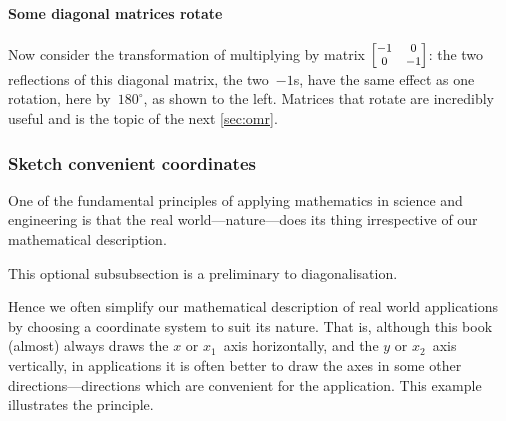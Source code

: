 \paragraph{Some diagonal matrices rotate}
Now consider the transformation of multiplying by matrix \(\footnotesize\begin{bmatrix} -1&0\\0&-1 \end{bmatrix}\):
%
the two reflections of this diagonal matrix, the two~\(-1\)s, have  the same effect as one rotation, here by~\(180^\circ\), as shown to the left.
Matrices that rotate are incredibly useful and is the topic of the next \autoref{sec:omr}.





\subsubsection{Sketch convenient coordinates}
One of the fundamental principles of applying mathematics in science and engineering
is that the real world---nature---does its thing irrespective of our mathematical description.
\begin{aside}
This optional subsubsection is a preliminary to diagonalisation.
\end{aside}%
Hence we often simplify our mathematical description of real world applications by choosing a coordinate system to suit its nature.
That is, although this book (almost) always draws the \(x\) or \(x_1\)~axis horizontally, and the \(y\) or \(x_2\)~axis vertically, in applications it is often better to draw the axes in some other  directions---directions which are convenient for the application.
This example illustrates the principle.


